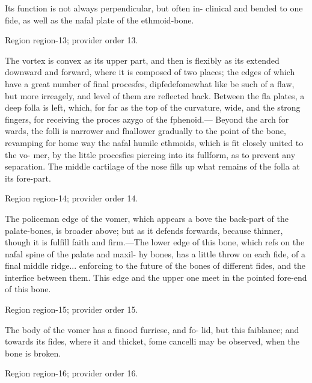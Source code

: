 \documentclass[11pt]{article}
\begin{document}
Its function is not always perpendicular, but often in-
clinical and bended to one fide, as well as the nafal plate
of the ethmoid-bone.
\par

{\scriptsize\color{gray} Region region-13; provider order 13.\par}
\medskip

The vortex is convex as its upper part, and then is
flexibly as its extended downward and forward, where
it is composed of two places; the edges of which have a
great number of final procesfes, dipfedefomewhat like
be such of a flaw, but more irreagely, and level of
them are reflected back. Between the fla plates, a deep
folla is left, which, for far as the top of the curvature,
wide, and the strong fingers, for receiving the proces
azygo of the fphenoid.— Beyond the arch for
wards, the folli is narrower and fhallower gradually to
the point of the bone, revamping for home way the nafal
humile ethmoids, which is fit closely united to the vo-
mer, by the little procesfies piercing into its fullform, as
to prevent any separation. The middle cartilage of the
nose fills up what remains of the folla at its fore-part.
\par

{\scriptsize\color{gray} Region region-14; provider order 14.\par}
\medskip

The policeman edge of the vomer, which appears a
bove the back-part of the palate-bones, is broader above;
but as it defends forwards, because thinner, though it
is fulfill faith and firm.—The lower edge of this bone,
which refs on the nafal spine of the palate and maxil-
hy bones, has a little throw on each fide, of a final
middle ridge... enforcing to the future of the bones of
different fides, and the interfice between them. This
edge and the upper one meet in the pointed fore-end of
this bone.
\par

{\scriptsize\color{gray} Region region-15; provider order 15.\par}
\medskip

The body of the vomer has a finood furriese, and fo-
lid, but this faiblance; and towards its fides, where it
and thicket, fome cancelli may be observed, when the
bone is broken.
\par

{\scriptsize\color{gray} Region region-16; provider order 16.\par}
\medskip
\end{document}
